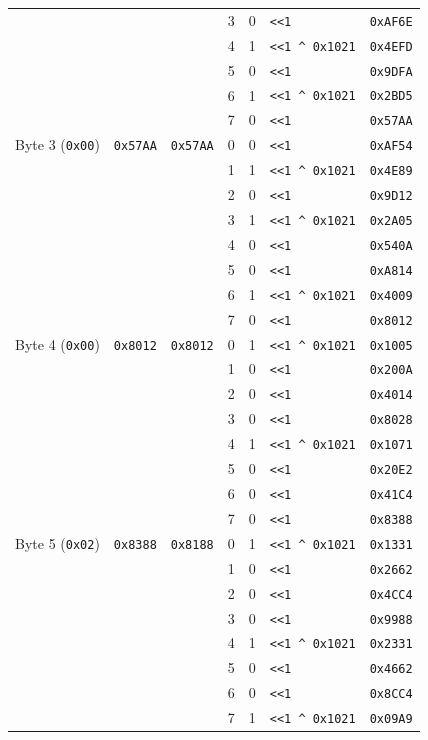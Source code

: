 \documentclass[11pt,a4paper,oneside]{report}
\begin{document}
\begin{longtable}{l c c c c l c}
 &  &  & 3 & 0 & \texttt{<<1} & \texttt{0xAF6E} \\
 &  &  & 4 & 1 & \texttt{<<1 \^{} 0x1021} & \texttt{0x4EFD} \\
 &  &  & 5 & 0 & \texttt{<<1} & \texttt{0x9DFA} \\
 &  &  & 6 & 1 & \texttt{<<1 \^{} 0x1021} & \texttt{0x2BD5} \\
 &  &  & 7 & 0 & \texttt{<<1} & \texttt{0x57AA} \\
\midrule
Byte 3 (\texttt{0x00}) & \texttt{0x57AA} & \texttt{0x57AA} & 0 & 0 & \texttt{<<1} & \texttt{0xAF54} \\
 &  &  & 1 & 1 & \texttt{<<1 \^{} 0x1021} & \texttt{0x4E89} \\
 &  &  & 2 & 0 & \texttt{<<1} & \texttt{0x9D12} \\
 &  &  & 3 & 1 & \texttt{<<1 \^{} 0x1021} & \texttt{0x2A05} \\
 &  &  & 4 & 0 & \texttt{<<1} & \texttt{0x540A} \\
 &  &  & 5 & 0 & \texttt{<<1} & \texttt{0xA814} \\
 &  &  & 6 & 1 & \texttt{<<1 \^{} 0x1021} & \texttt{0x4009} \\
 &  &  & 7 & 0 & \texttt{<<1} & \texttt{0x8012} \\
\midrule
Byte 4 (\texttt{0x00}) & \texttt{0x8012} & \texttt{0x8012} & 0 & 1 & \texttt{<<1 \^{} 0x1021} & \texttt{0x1005} \\
 &  &  & 1 & 0 & \texttt{<<1} & \texttt{0x200A} \\
 &  &  & 2 & 0 & \texttt{<<1} & \texttt{0x4014} \\
 &  &  & 3 & 0 & \texttt{<<1} & \texttt{0x8028} \\
 &  &  & 4 & 1 & \texttt{<<1 \^{} 0x1021} & \texttt{0x1071} \\
 &  &  & 5 & 0 & \texttt{<<1} & \texttt{0x20E2} \\
 &  &  & 6 & 0 & \texttt{<<1} & \texttt{0x41C4} \\
 &  &  & 7 & 0 & \texttt{<<1} & \texttt{0x8388} \\
\midrule
Byte 5 (\texttt{0x02}) & \texttt{0x8388} & \texttt{0x8188} & 0 & 1 & \texttt{<<1 \^{} 0x1021} & \texttt{0x1331} \\
 &  &  & 1 & 0 & \texttt{<<1} & \texttt{0x2662} \\
 &  &  & 2 & 0 & \texttt{<<1} & \texttt{0x4CC4} \\
 &  &  & 3 & 0 & \texttt{<<1} & \texttt{0x9988} \\
 &  &  & 4 & 1 & \texttt{<<1 \^{} 0x1021} & \texttt{0x2331} \\
 &  &  & 5 & 0 & \texttt{<<1} & \texttt{0x4662} \\
 &  &  & 6 & 0 & \texttt{<<1} & \texttt{0x8CC4} \\
 &  &  & 7 & 1 & \texttt{<<1 \^{} 0x1021} & \texttt{0x09A9} \\
\end{longtable}
\end{document}
